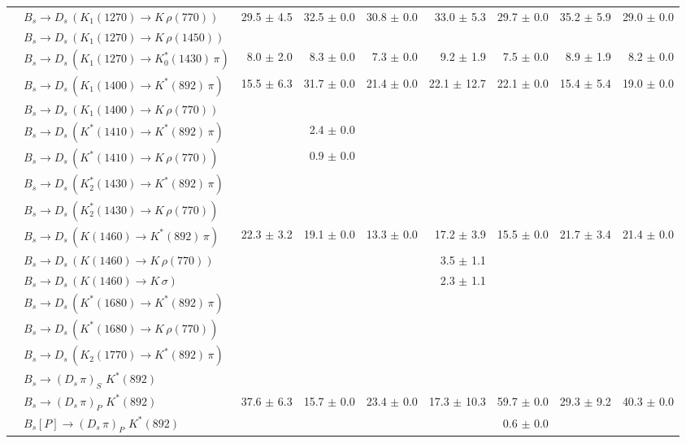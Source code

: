 \begin{tabular}{l l  r  r  r  r  r  r  r  }
 & $B_s \to D_s \, ( K_1(1270) \to K \, \rho(770) )$ & 29.5 $\pm$ 4.5 & 32.5 $\pm$ 0.0 & 30.8 $\pm$ 0.0 & 33.0 $\pm$ 5.3 & 29.7 $\pm$ 0.0 & 35.2 $\pm$ 5.9 & 29.0 $\pm$ 0.0 \\ 
 & $B_s \to D_s \, ( K_1(1270) \to K \, \rho(1450) )$ &  &  &  &  &  &  &  \\ 
 & $B_s \to D_s \, ( K_1(1270) \to K^{*}_{0}(1430) \, \pi )$ & 8.0 $\pm$ 2.0 & 8.3 $\pm$ 0.0 & 7.3 $\pm$ 0.0 & 9.2 $\pm$ 1.9 & 7.5 $\pm$ 0.0 & 8.9 $\pm$ 1.9 & 8.2 $\pm$ 0.0 \\ 
 & $B_s \to D_s \, ( K_1(1400) \to K^{*}(892) \, \pi )$ & 15.5 $\pm$ 6.3 & 31.7 $\pm$ 0.0 & 21.4 $\pm$ 0.0 & 22.1 $\pm$ 12.7 & 22.1 $\pm$ 0.0 & 15.4 $\pm$ 5.4 & 19.0 $\pm$ 0.0 \\ 
 & $B_s \to D_s \, ( K_1(1400) \to K \, \rho(770) )$ &  &  &  &  &  &  &  \\ 
 & $B_s \to D_s \, ( K^{*}(1410) \to K^{*}(892) \, \pi )$ &  & 2.4 $\pm$ 0.0 &  &  &  &  &  \\ 
 & $B_s \to D_s \, ( K^{*}(1410) \to K \, \rho(770) )$ &  & 0.9 $\pm$ 0.0 &  &  &  &  &  \\ 
 & $B_s \to D_s \, ( K_2^{*}(1430) \to K^{*}(892) \, \pi )$ &  &  &  &  &  &  &  \\ 
 & $B_s \to D_s \, ( K_2^{*}(1430) \to K \, \rho(770) )$ &  &  &  &  &  &  &  \\ 
 & $B_s \to D_s \, ( K(1460) \to K^{*}(892) \, \pi )$ & 22.3 $\pm$ 3.2 & 19.1 $\pm$ 0.0 & 13.3 $\pm$ 0.0 & 17.2 $\pm$ 3.9 & 15.5 $\pm$ 0.0 & 21.7 $\pm$ 3.4 & 21.4 $\pm$ 0.0 \\ 
 & $B_s \to D_s \, ( K(1460) \to K \, \rho(770) )$ &  &  &  & 3.5 $\pm$ 1.1 &  &  &  \\ 
 & $B_s \to D_s \, ( K(1460) \to K \, \sigma )$ &  &  &  & 2.3 $\pm$ 1.1 &  &  &  \\ 
 & $B_s \to D_s \, ( K^{*}(1680) \to K^{*}(892) \, \pi )$ &  &  &  &  &  &  &  \\ 
 & $B_s \to D_s \, ( K^{*}(1680) \to K \, \rho(770) )$ &  &  &  &  &  &  &  \\ 
 & $B_s \to D_s \, ( K_2(1770) \to K^{*}(892) \, \pi )$ &  &  &  &  &  &  &  \\ 
 & $B_s \to ( D_s \, \pi)_{S} \, \, K^{*}(892)$ &  &  &  &  &  &  &  \\ 
 & $B_s \to ( D_s \, \pi)_{P} \, \, K^{*}(892)$ & 37.6 $\pm$ 6.3 & 15.7 $\pm$ 0.0 & 23.4 $\pm$ 0.0 & 17.3 $\pm$ 10.3 & 59.7 $\pm$ 0.0 & 29.3 $\pm$ 9.2 & 40.3 $\pm$ 0.0 \\ 
 & $B_s[P] \to ( D_s \, \pi)_{P} \, \, K^{*}(892)$ &  &  &  &  & 0.6 $\pm$ 0.0 &  &  \\ 

\end{tabular}
